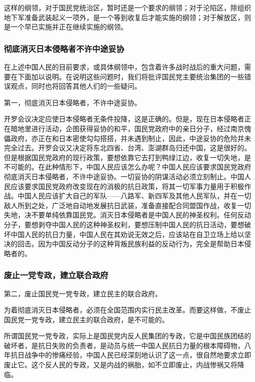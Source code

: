 这样的纲领，对于国民党统治区，暂时还是一个要求的纲领；对于沦陷区，除组织地下军准备武装起义一项外，是一个等到收复后才能实施的纲领；对于解放区，则是一个早已实施并正在继续实施的纲领。

\subsubsection{彻底消灭日本侵略者不许中途妥协}

在上述中国人民的目前要求，或具体纲领中，包含着许多战时战后的重大问题，需要在下面加以说明。在说明这些问题时，我们将批评国民党主要统治集团的一些错误观点，同时也将回答其他人们的一些疑问。

第一，彻底消灭日本侵略者，不许中途妥协。

开罗会议决定应使日本侵略者无条件投降，这是正确的。但是，现在日本侵略者正在暗地里进行活动，企图获得妥协的和平，国民党政府中的亲日分子，经过南京傀儡政府，亦正在和日本密使勾勾搭搭，并未遇到制止，因此，中途妥协的危险并未完全过去。开罗会议又决定将东北四省、台湾、澎湖群岛归还中国，这是很好的。但是根据国民党政府的现行政策，要想依靠它去打到鸭绿江边，收复一切失地，是不可能的。在此种情形下，中国人民应该怎么办呢？中国人民应该要求国民党政府彻底消灭日本侵略者，不许中途妥协。一切妥协的阴谋活动必须立刻制止。中国人民应该要求国民党政府改变现在的消极的抗日政策，将其一切军事力量用于积极作战。中国人民应该扩大自己的军队——八路军、新四军及其他人民军队，并在一切敌人所到之处，广泛地自动地发展抗日武装，准备直接配合同盟国作战，收复一切失地，决不要单纯依靠国民党。消灭日本侵略者是中国人民的神圣权利。任何反动分子，要想剥夺中国人民的这种神圣权利，要想压制中国人民的抗日活动，要想破坏中国人民的抗日力量，中国人民在其劝说无效之后，应该站在自卫立场上给以坚决的回击。因为中国反动分子的这种背叛民族利益的反动行为，完全是帮助日本侵略者的。

\subsubsection{废止一党专政，建立联合政府}

第二，废止国民党一党专政，建立民主的联合政府。

为着彻底消灭日本侵略者，必须在全国范围内实行民主改革。而要这样做，不废止国民党一党专政，建立民主的联合政府，是不可能的。

所谓国民党一党专政，实际上是国民党内反人民集团的专政，它是中国民族团结的破坏者，是抗日失败的负责者，是动员与统一中国人民抗日力量的根本障碍物，八年抗日战争中的惨痛经验，中国人民已经深刻地认识了这一点，很自然地要求立即废止它。这个反人民的专政，又是内战的祸胎，如不立即废止，内战惨祸又将降临。

